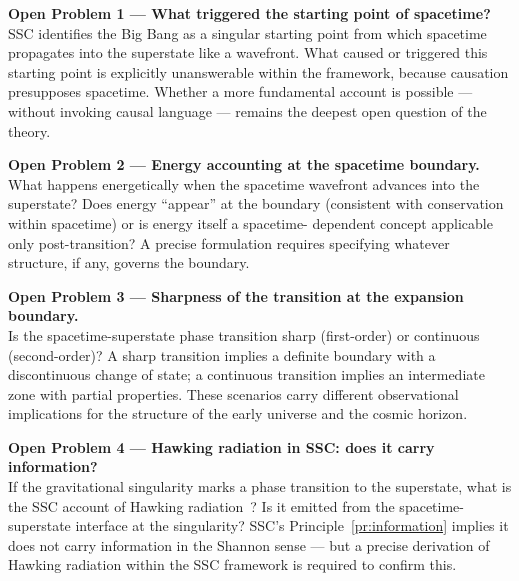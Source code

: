 \documentclass[12pt,a4paper]{article}
\begin{document}
\begin{openbox}
\textbf{Open Problem 1 — What triggered the starting point of spacetime?}\\
SSC identifies the Big Bang as a singular starting point from which
spacetime propagates into the superstate like a wavefront.  What caused
or triggered this starting point is explicitly unanswerable within the
framework, because causation presupposes spacetime.  Whether a more
fundamental account is possible — without invoking causal language —
remains the deepest open question of the theory.
\end{openbox}

\begin{openbox}
\textbf{Open Problem 2 — Energy accounting at the spacetime boundary.}\\
What happens energetically when the spacetime wavefront advances into
the superstate?  Does energy ``appear'' at the boundary (consistent
with conservation within spacetime) or is energy itself a spacetime-
dependent concept applicable only post-transition?  A precise formulation
requires specifying whatever structure, if any, governs the boundary.
\end{openbox}

\begin{openbox}
\textbf{Open Problem 3 — Sharpness of the transition at the expansion boundary.}\\
Is the spacetime-superstate phase transition sharp (first-order) or
continuous (second-order)?  A sharp transition implies a definite
boundary with a discontinuous change of state; a continuous transition
implies an intermediate zone with partial properties.  These scenarios
carry different observational implications for the structure of the
early universe and the cosmic horizon.
\end{openbox}

\begin{openbox}
\textbf{Open Problem 4 — Hawking radiation in SSC: does it carry information?}\\
If the gravitational singularity marks a phase transition to the
superstate, what is the SSC account of Hawking
radiation~\citep{hawking1975}?  Is it emitted from the spacetime-
superstate interface at the singularity?  SSC's
Principle~\ref{pr:information} implies it does not carry information
in the Shannon sense — but a precise derivation of Hawking radiation
within the SSC framework is required to confirm this.
\end{openbox}
\end{document}
